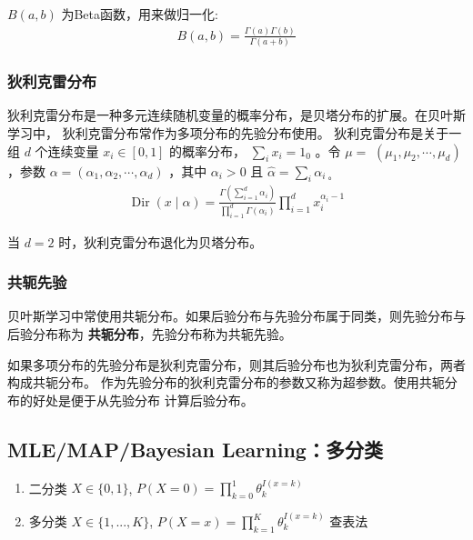 \documentclass[UTF8]{ctexart}
\begin{document}
$B(a, b)$ 为Beta函数，用来做归一化:
$$
\begin{aligned}
B(a, b)=\frac{\Gamma(a) \Gamma(b)}{\Gamma(a+b)}
\end{aligned}
$$


\subsubsection{狄利克雷分布}
狄利克雷分布是一种多元连续随机变量的概率分布，是贝塔分布的扩展。在贝叶斯学习中，
狄利克雷分布常作为多项分布的先验分布使用。
狄利克雷分布是关于一组 $d$ 个连续变量 $x_{i} \in[0,1]$ 的概率分布， $\sum_{i} x_{i}=1_{0}$ 。令 $\mu=$ $\left(\mu_{1}, \mu_{2}, \cdots, \mu_{d}\right)$ ，参数 $\alpha=\left(\alpha_{1}, \alpha_{2}, \cdots, \alpha_{d}\right)$ ，其中 $\alpha_{i}>0$ 且 $\hat{\alpha}=\sum_{i} \alpha_{i \text { 。 }}$
$$
\begin{aligned}
\operatorname{Dir}(x \mid \alpha)=\frac{\Gamma(\sum^{d}_{i=1}\alpha_i)}{\prod_{i=1}^{d}\Gamma(\alpha_i)}  \prod_{i=1}^{d}x_{i}^{\alpha_{i}-1}
\end{aligned}
$$

当 $d=2$ 时，狄利克雷分布退化为贝塔分布。


\subsubsection{共轭先验}
贝叶斯学习中常使用共轭分布。如果后验分布与先验分布属于同类，则先验分布与后验分布称为
\textbf{共轭分布}，先验分布称为共轭先验。

如果多项分布的先验分布是狄利克雷分布，则其后验分布也为狄利克雷分布，两者构成共轭分布。
作为先验分布的狄利克雷分布的参数又称为超参数。使用共轭分布的好处是便于从先验分布
计算后验分布。

\subsection{MLE/MAP/Bayesian Learning：多分类}


\begin{enumerate}
    \item 二分类 $X\in\{0,1\}$, $P(X=0)=\prod^{1}_{k=0}\theta_k^{I(x=k)}$
    \item 多分类 $X\in\{1,...,K\}$, $P(X=x)=\prod^{K}_{k=1}\theta_k^{I(x=k)}$ 查表法
\end{enumerate}
\end{document}
